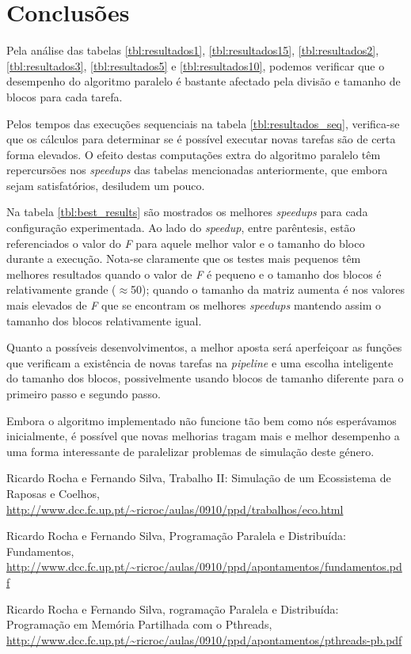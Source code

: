 \documentclass[12pt]{article}
\begin{document}
\section{Conclusões}

Pela análise das tabelas \ref{tbl:resultados1}, \ref{tbl:resultados15}, \ref{tbl:resultados2}, \ref{tbl:resultados3},
\ref{tbl:resultados5} e \ref{tbl:resultados10}, podemos verificar que o desempenho do algoritmo paralelo é bastante
afectado pela divisão e tamanho de blocos para cada tarefa.

Pelos tempos das execuções sequenciais na tabela \ref{tbl:resultados_seq}, verifica-se que os cálculos
para determinar se é possível executar novas tarefas são de certa forma elevados. O efeito destas computações
extra do algoritmo paralelo têm repercursões nos \textit{speedups} das tabelas mencionadas anteriormente,
que embora sejam satisfatórios, desiludem um pouco.

Na tabela \ref{tbl:best_results} são mostrados os melhores \textit{speedups} para cada configuração experimentada.
Ao lado do \textit{speedup}, entre parêntesis, estão referenciados o valor do \textit{F} para aquele melhor valor
e o tamanho do bloco durante a execução. Nota-se claramente que os testes mais pequenos têm melhores resultados
quando o valor de \textit{F} é pequeno e o tamanho dos blocos é relativamente grande ($\approx$50);
quando o tamanho da matriz aumenta é nos valores mais elevados de \textit{F} que se encontram os melhores
\textit{speedups} mantendo assim o tamanho dos blocos relativamente igual.

Quanto a possíveis desenvolvimentos, a melhor aposta será aperfeiçoar as funções que verificam
a existência de novas tarefas na \textit{pipeline} e uma escolha inteligente do tamanho dos blocos, possivelmente
usando blocos de tamanho diferente para o primeiro passo e segundo passo.

Embora o algoritmo implementado não funcione tão bem como nós esperávamos inicialmente, é possível que
novas melhorias tragam mais e melhor desempenho a uma forma interessante de paralelizar problemas de simulação
deste género.

\renewcommand{\bibname}{Referências}
\begin{thebibliography}{10}
  
	 Ricardo Rocha e Fernando Silva, Trabalho II: Simulação de um Ecossistema de Raposas e Coelhos, \url{http://www.dcc.fc.up.pt/~ricroc/aulas/0910/ppd/trabalhos/eco.html}
	
	 Ricardo Rocha e Fernando Silva, Programação Paralela e Distribuída: Fundamentos,
	\url{http://www.dcc.fc.up.pt/~ricroc/aulas/0910/ppd/apontamentos/fundamentos.pdf}
	
	 Ricardo Rocha e Fernando Silva, rogramação Paralela e Distribuída: Programação em Memória Partilhada com o Pthreads, \url{http://www.dcc.fc.up.pt/~ricroc/aulas/0910/ppd/apontamentos/pthreads-pb.pdf}
	
\end{thebibliography}


\end{document}

